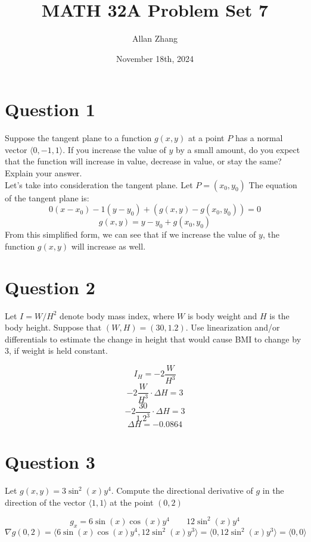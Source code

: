 \documentclass[hidelinks]{article}
\title{\textbf{MATH 32A Problem Set 7}}
\author{Allan Zhang}
\date{November 18th, 2024}
\begin{document}
\hypersetup{bookmarksnumbered=true,}
\pagecolor{white}
\color{black}
\maketitle


\section{Question 1}
Suppose the tangent plane to a function $g(x, y)$ at a point $P$ has a normal
vector $\langle 0, -1, 1 \rangle$. If you increase the value of $ y$ by a small amount, do you expect that the
function will increase in value, decrease in value, or stay the same? Explain your answer. \\

Let's take into consideration the tangent plane. Let $P = (x_0, y_0)$ The equation of the tangent plane is: \[
0(x-x_0) -1(y-y_0)+(g(x, y) -g(x_0, y_0)) = 0
\]
\[
g(x, y) = y - y_0 + g(x_0, y_0)
\]
From this simplified form, we can see that if we increase the value of $y$, the function $g(x, y)$ will increase as well. 

\newpage
\section{Question 2}
Let $I = W/H^2$ denote body mass index, where $W$ is body weight and $H$ is
the body height. Suppose that $(W, H) = (30, 1.2)$. Use linearization and/or differentials
to estimate the change in height that would cause BMI to change by 3, if weight is held constant. 

\[
	I_{H} = -2\frac{W}{H^3}
\]
\[
        -2\frac{W}{H^3} \cdot \Delta H = 3
\]
\[
	-2\frac{30}{1.2^3} \cdot \Delta H = 3  
\]
\[
	\Delta H = -0.0864
\]

\newpage

\section{Question 3}
Let $g(x, y) = 3\sin^2(x)y^4$. Compute the directional derivative of $g$ in the direction of the vector $\langle 1, 1 \rangle$ at the point $(0, 2)$

\[
	g_x = 6 \sin(x)\cos(x)y^4 \quad \quad 12\sin^2(x)y^4
\]
\[ \nabla g(0, 2) = \langle 6 \sin(x)\cos(x)y^4,  12 \sin^2(x)y^3  \rangle = \langle 
 0,  12 \sin^2(x)y^3  \rangle  = \langle 0, 0 \rangle\]
\end{document}
